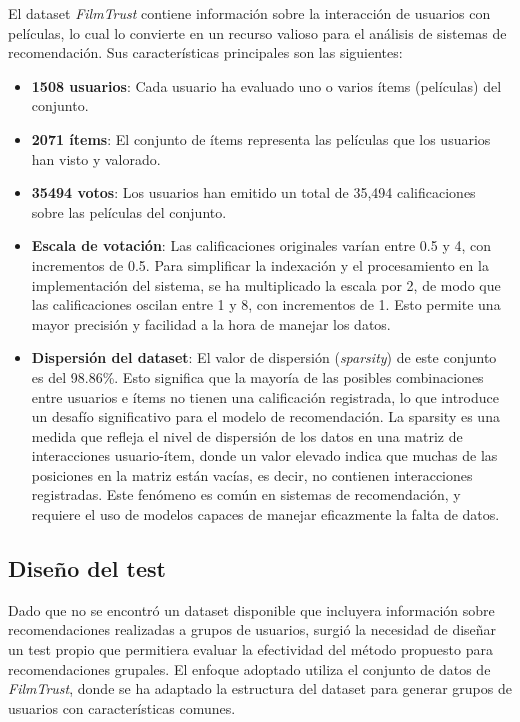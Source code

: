 \documentclass[runningheads,a4paper]{llncs}
\begin{document}
 El dataset \textit{FilmTrust} contiene información 
 sobre la interacción de usuarios con películas, 
 lo cual lo convierte en un recurso valioso para el 
 análisis de sistemas de recomendación. 
 Sus características principales son las siguientes:
 \begin{itemize}
    \item \textbf{1508 usuarios}: Cada usuario ha 
    evaluado uno o varios ítems (películas) del conjunto.
    \item \textbf{2071 ítems}: El conjunto de ítems representa las películas que los usuarios han visto y valorado.
    \item \textbf{35494 votos}: Los usuarios han emitido un total de 35,494 calificaciones sobre las películas del conjunto.
    \item \textbf{Escala de votación}: Las calificaciones originales varían entre 0.5 y 4, con incrementos de 0.5. Para simplificar la indexación y el procesamiento en la implementación del sistema, se ha multiplicado la escala por 2, de modo que las calificaciones oscilan entre 1 y 8, con incrementos de 1. Esto permite una mayor precisión y facilidad a la hora de manejar los datos.
    \item \textbf{Dispersión del dataset}: El valor de dispersión (\textit{sparsity}) de este conjunto es del 98.86\%. Esto significa que la mayoría de las posibles combinaciones entre usuarios e ítems no tienen una calificación registrada, lo que introduce un desafío significativo para el modelo de recomendación. La sparsity es una medida que refleja el nivel de dispersión de los datos en una matriz de interacciones usuario-ítem, donde un valor elevado indica que muchas de las posiciones en la matriz están vacías, es decir, no contienen interacciones registradas. Este fenómeno es común en sistemas de recomendación, y requiere el uso de modelos capaces de manejar eficazmente la falta de datos.
 \end{itemize}

 \subsection{Diseño del test}
 Dado que no se encontró un dataset disponible que incluyera información sobre recomendaciones realizadas a grupos de usuarios, surgió la necesidad de diseñar un test propio que permitiera evaluar la efectividad del método propuesto para recomendaciones grupales. El enfoque adoptado utiliza el conjunto de datos de \textit{FilmTrust}, donde se ha adaptado la estructura del dataset para generar grupos de usuarios con características comunes.
\end{document}
